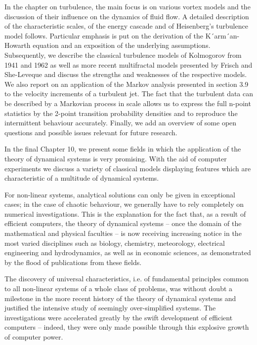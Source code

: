 \documentclass[12pt]{article}
\begin{document}
In the chapter on turbulence, the main focus is on various vortex models and the
discussion of their influence on the dynamics of fluid flow. A detailed description of
the characteristic scales, of the energy cascade and of Heisenberg’s turbulence model
follows. Particular emphasis is put on the derivation of the K´arm´an-Howarth equation
and an exposition of the underlying assumptions. Subsequently, we describe
the classical turbulence models of Kolmogorov from 1941 and 1962 as well as more
recent multifractal models presented by Frisch and She-Leveque and discuss the
strengths and weaknesses of the respective models. We also report on an application
of the Markov analysis presented in section 3.9 to the velocity increments of
a turbulent jet. The fact that the turbulent data can be described by a Markovian
process in scale allows us to express the full n-point statistics by the 2-point transition
probability densities and to reproduce the intermittent behaviour accurately.
Finally, we add an overview of some open questions and possible issues relevant for
future research.

\hfill

In the final Chapter 10, we present some fields in which the application of the theory
of dynamical systems is very promising. With the aid of computer experiments
we discuss a variety of classical models displaying features which are characteristic
of a multitude of dynamical systems.

\hfill

For non-linear systems, analytical solutions can only be given in exceptional cases;
in the case of chaotic behaviour, we generally have to rely completely on numerical
investigations. This is the explanation for the fact that, as a result of efficient computers,
the theory of dynamical systems – once the domain of the mathematical and
physical faculties – is now receiving increasing notice in the most varied disciplines
such as biology, chemistry, meteorology, electrical engineering and hydrodynamics,
as well as in economic sciences, as demonstrated by the flood of publications from
these fields.

\hfill

The discovery of universal characteristics, i.e. of fundamental principles common
to all non-linear systems of a whole class of problems, was without doubt a milestone
in the more recent history of the theory of dynamical systems and justified
the intensive study of seemingly over-simplified systems. The investigations were
accelerated greatly by the swift development of efficient computers – indeed, they
were only made possible through this explosive growth of computer power.
\end{document}
